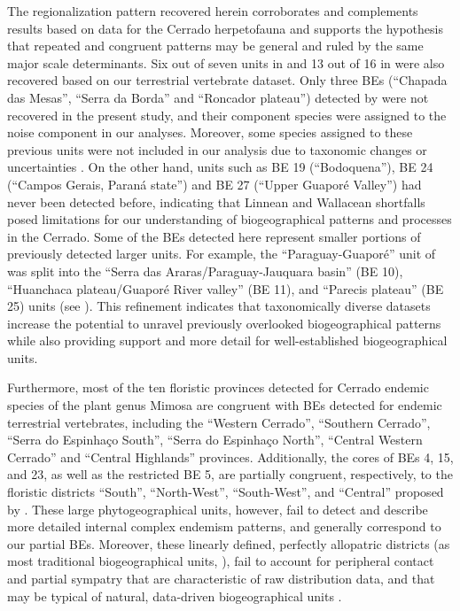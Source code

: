 \documentclass[12pt,openright,oneside,a4paper,english]{abntex2}
\begin{document}
The regionalization pattern recovered herein corroborates and complements results based on data for the Cerrado herpetofauna \citep{Nogueira2011, Azevedo2016} and supports the hypothesis that repeated and congruent patterns may be general and ruled by the same major scale determinants. Six out of seven units in \citet{Nogueira2011} and 13 out of 16 in \citet{Azevedo2016} were also recovered based on our terrestrial vertebrate dataset. Only three BEs (“Chapada das Mesas”, “Serra da Borda” and “Roncador plateau”) detected by \citet{Azevedo2016} were not recovered in the present study, and their component species  were assigned to the noise component in our analyses. Moreover, some species assigned to these previous units were not included in our analysis due to taxonomic changes or uncertainties \citep{Frost2020, Uetz2020}. On the other hand, units such as BE 19 (“Bodoquena”), BE 24 (“Campos Gerais, Paraná state”) and BE 27 (“Upper Guaporé Valley”) had never been detected before, indicating that Linnean and Wallacean shortfalls posed limitations for our understanding of biogeographical patterns and processes in the Cerrado. Some of the BEs detected here represent smaller portions of previously detected larger units. For example, the “Paraguay-Guaporé” unit of \citet{Nogueira2011} was split into the “Serra das Araras/Paraguay-Jauquara basin” (BE 10), “Huanchaca plateau/Guaporé River valley” (BE 11), and “Parecis plateau” (BE 25) units (see ). This refinement indicates that taxonomically diverse datasets increase the potential to unravel previously overlooked biogeographical patterns while also providing support and more detail for well-established biogeographical units.

Furthermore, most of the ten floristic provinces detected for Cerrado endemic species of the plant genus Mimosa \citep{Simon2000} are congruent with BEs detected for endemic terrestrial vertebrates, including the “Western Cerrado”, “Southern Cerrado”, “Serra do Espinhaço South”, “Serra do Espinhaço North”, “Central Western Cerrado” and “Central Highlands” provinces. Additionally, the cores of BEs 4, 15, and 23, as well as the restricted BE 5, are partially congruent, respectively, to the floristic districts “South”, “North-West”, “South-West”, and “Central” proposed by \citet{Francoso2020}. These large phytogeographical units, however, fail to detect and describe more detailed internal complex endemism patterns, and generally correspond to our partial BEs. Moreover, these linearly defined, perfectly allopatric districts (as most traditional biogeographical units, \citealp[see][]{Hausdorf2002}), fail to account for peripheral contact and partial sympatry that are characteristic of raw distribution data, and that may be typical of natural, data-driven biogeographical units \citep{Hausdorf2002}.
\end{document}
